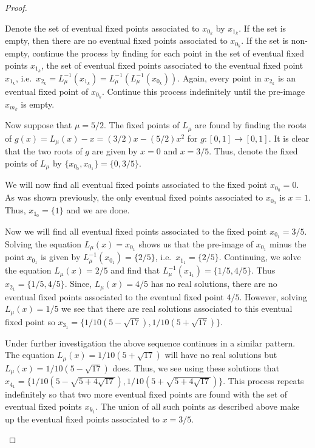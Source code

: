 \begin{proof}
\begin{enumerate}
      Denote the set of eventual fixed points associated to $x_{0_k}$ by $x_{1_k}$.
      If the set is empty, then there are no eventual fixed points associated to $x_{0_k}$.
      If the set is non-empty, continue the process by finding for each point in
      the set of eventual fixed points $x_{1_k}$, the set
      of eventual fixed points associated to the eventual fixed point $x_{1_k}$,
      i.e.\ $x_{2_k} = L_\mu^{-1}\left(x_{1_k}\right) = L_\mu^{-1}\left(L_\mu^{-1}\left(x_{0_k}\right)\right)$.
      Again, every point in $x_{2_k}$ is an eventual fixed point of $x_{0_k}$.
      Continue this process indefinitely until the pre-image $x_{m_k}$ is empty.

      Now suppose that $\mu = 5/2$. The fixed points of $L_\mu$ are found by finding
      the roots of $g(x) = L_\mu(x) - x = (3/2)x - (5/2)x^2$ for $g:[0, 1] \to [0, 1]$.
      It is clear that the two roots of $g$ are given by $x=0$
      and $x =3/5$. Thus, denote the fixed points of $L_\mu$ by $\{x_{0_0}, x_{0_1}\} = \{0, 3/5\}$.

      We will now find all eventual fixed points associated to the fixed point
      $x_{0_0} = 0$. As was shown previously, the only eventual fixed points associated to
      $x_{0_0}$ is $x = 1$. Thus, $x_{1_0} = \{1\}$ and we are done.

      Now we will find all eventual fixed points associated to the fixed point
      $x_{0_1} = 3/5$.  Solving the equation $L_\mu(x) = x_{0_1}$ shows us that the pre-image
      of $x_{0_1}$ minus the point $x_{0_1}$ is given by $L_\mu^{-1}\left(x_{0_1}\right) = \{2/5 \}$, i.e.\
      $x_{1_1} = \{2/5\}$. Continuing, we solve the equation $L_\mu(x) = 2/5$ and find that
      $L_\mu^{-1}(x_{1_1}) = \{1/5, 4/5\}$. Thus $x_{2_1} = \{1/5, 4/5\}$.
      Since, $L_\mu(x) =  4/5$ has no real solutions, there are no eventual fixed points associated to the eventual fixed point $4/5$.
      However, solving $L_\mu(x) =  1/5$ we see that there are real solutions associated to this eventual fixed point
      so $x_{3_1} = \{1/10 (5 - \sqrt{17}), 1/10 (5 + \sqrt{17})\}$.

      Under further investigation the above sequence continues in a similar pattern. The equation
      $L_\mu(x) =  1/10 (5 + \sqrt{17})$ will have no real solutions but
      $L_\mu(x) =  1/10 (5 - \sqrt{17})$ does. Thus, we see using these solutions that
      $x_{4_1} = \{1/10 (5 - \sqrt{5 + 4 \sqrt{17}}), 1/10 (5 +  \sqrt{5 + 4 \sqrt{17}})\}$.
      This process repeats indefinitely
      so that two more eventual fixed points are found with the set of eventual fixed points $x_{k_1}$.
      The union of all such points as described above  make up the eventual
      fixed points associated to $x = 3/5$.
  \end{enumerate}
\end{proof}
\newpage

